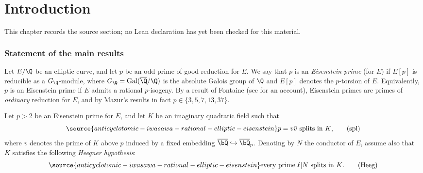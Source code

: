 \chapter{Introduction}
\label{anticyclotomic-iwasawa-rational-elliptic-eisenstein-chapter-01}

\begin{remark}
\label{anticyclotomic-iwasawa-rational-elliptic-eisenstein-chapter-01-source}
This chapter records the source section; no Lean declaration has yet been checked for this material.
\notready
\end{remark}




\subsection{Statement of the main results}

Let $E/\Q$ be an elliptic curve, and let $p$ be an odd prime of good reduction for $E$. We say that $p$ is an \emph{Eisenstein prime} (for $E$) if $E[p]$ is reducible as a $G_\Q$-module, where $G_\Q={\rm Gal}(\overline{\Q}/\Q)$ is the absolute Galois group of $\Q$ and $E[p]$ denotes the $p$-torsion of $E$. Equivalently, $p$ is an Eisenstein prime if $E$ admits a rational $p$-isogeny. By a result of Fontaine (see \cite{edixhoven-weight} for an account), Eisenstein primes are primes of \emph{ordinary} reduction for $E$, and by Mazur's results \cite{mazur} in fact $p\in\{3, 5, 7, 13, 37\}$.


Let $p>2$ be an Eisenstein prime for $E$, and let $K$ be an imaginary quadratic field such that
\begin{equation}\label{eq:intro-spl}
\source{anticyclotomic-iwasawa-rational-elliptic-eisenstein}
\textrm{$p=v\bar{v}$ splits in $K$,}\tag{spl}
\end{equation}
where $v$ denotes the prime of $K$ above $p$ induced by a fixed embedding $\overline{\bQ}\hookrightarrow\overline{\bQ}_p$.
Denoting by $N$ the conductor of $E$, assume also that $K$ satisfies the following \emph{Heegner hypothesis}:
\begin{equation}\label{eq:intro-Heeg}
\source{anticyclotomic-iwasawa-rational-elliptic-eisenstein}
\textrm{every prime $\ell\vert N$ splits in $K$.}\tag{Heeg}
\end{equation}

